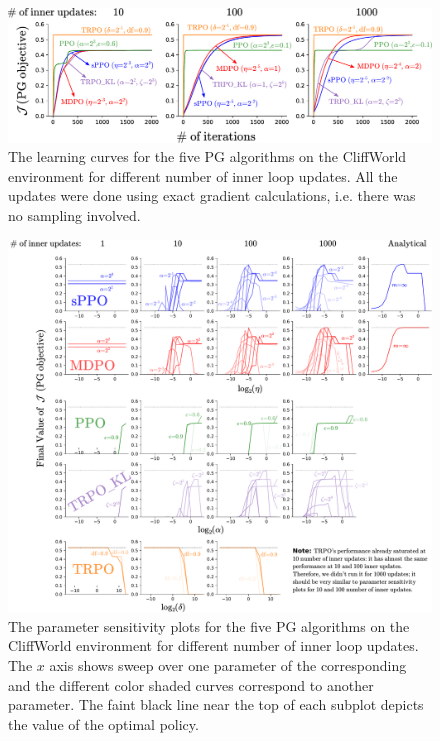 \documentclass[a4paper, 10pt]{article}
\begin{document}
\begin{figure}[!bp]
  \centering
  \includegraphics[scale=0.6]{tabular_figures/learning_curves.pdf}
  \caption{The learning curves for the five PG algorithms on the CliffWorld environment for different number of inner loop updates. All the updates were done using exact gradient calculations, i.e. there was no sampling involved.}
  \label{fig: learning_curves}
\end{figure}

\begin{figure}[!bp]
  \centering
  \includegraphics[scale=0.45]{tabular_figures/sensitivity.pdf}
  \caption{The parameter sensitivity plots for the five PG algorithms on the CliffWorld environment for different number of inner loop updates. The $x$ axis shows sweep over one parameter of the corresponding and the different color shaded curves correspond to another parameter. The faint black line near the top of each subplot depicts the value of the optimal policy.}
  \label{fig: sensitivity}
\end{figure}
\end{document}
